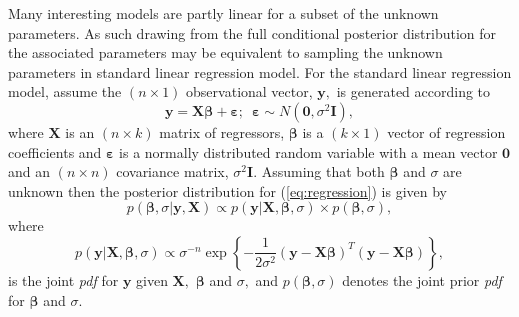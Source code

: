 \documentclass[article]{jss}
\begin{document}
Many interesting models are partly linear for a subset of the unknown
parameters. As such drawing from the full conditional posterior
distribution for the associated parameters may be equivalent to
sampling the unknown parameters in standard linear regression model.
For the standard linear regression model, assume the
$\left(n\times1\right)$ observational vector, $\bm{y},$ is generated
according to\begin{equation}
  \bm{y}=\bm{X}\bm{\beta}+\bm{\varepsilon};\,\,\,\bm{\varepsilon}\sim
  N(\bm{0},\sigma^{2}\bm{I}),\label{eq:regression}\end{equation} where
$\bm{X}$ is an $(n\times k)$ matrix of regressors, $\bm{\beta}$ is a
$\left(k\times1\right)$ vector of regression coefficients and
$\bm{\varepsilon}$ is a normally distributed random variable with a
mean vector $\bm{0}$ and an $\left(n\times n\right)$ covariance
matrix, $\sigma^{2}\bm{I}.$ Assuming that both $\bm{\beta}$ and
$\sigma$ are unknown then the posterior distribution for
(\ref{eq:regression}) is given by\begin{equation}
  p(\bm{\beta},\sigma|\bm{y},\bm{X})\propto
  p(\bm{y}|\bm{X},\bm{\beta},\sigma)\times
  p(\bm{\beta},\sigma),\label{eq:post regression}\end{equation} where
\begin{equation}
  p(\bm{y}|\bm{X},\bm{\beta},\sigma)\propto\sigma^{-n}\exp\left\{
    -\frac{1}{2\sigma^{2}}\left(\bm{y}-\bm{X}\bm{\beta}\right)^{T}\left(\bm{y}-\bm{X}\bm{\beta}\right)\right\}
  ,\label{eq:likelihood regression}\end{equation} is the joint
\emph{pdf }for $\bm{y}$ given $\bm{X},$ $\bm{\beta}$ and
$\sigma,$\emph{ }and\emph{ $p(\bm{\beta},\sigma)$ }denotes the joint
prior \emph{pdf} for $\bm{\beta}$ and $\sigma.$
\end{document}
